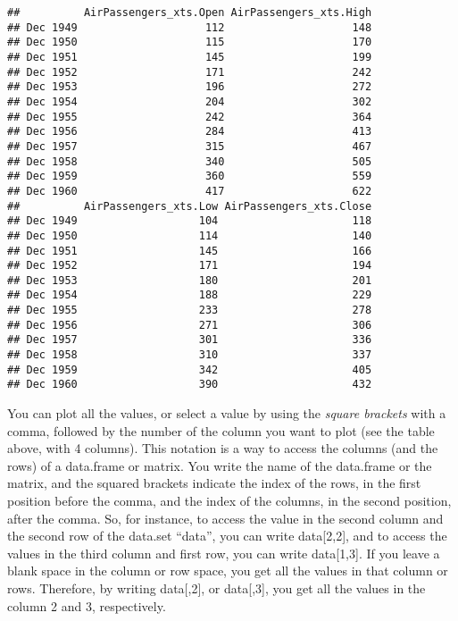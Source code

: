 \documentclass[
]{article}
\begin{document}
\begin{verbatim}
##          AirPassengers_xts.Open AirPassengers_xts.High
## Dec 1949                    112                    148
## Dec 1950                    115                    170
## Dec 1951                    145                    199
## Dec 1952                    171                    242
## Dec 1953                    196                    272
## Dec 1954                    204                    302
## Dec 1955                    242                    364
## Dec 1956                    284                    413
## Dec 1957                    315                    467
## Dec 1958                    340                    505
## Dec 1959                    360                    559
## Dec 1960                    417                    622
##          AirPassengers_xts.Low AirPassengers_xts.Close
## Dec 1949                   104                     118
## Dec 1950                   114                     140
## Dec 1951                   145                     166
## Dec 1952                   171                     194
## Dec 1953                   180                     201
## Dec 1954                   188                     229
## Dec 1955                   233                     278
## Dec 1956                   271                     306
## Dec 1957                   301                     336
## Dec 1958                   310                     337
## Dec 1959                   342                     405
## Dec 1960                   390                     432
\end{verbatim}

You can plot all the values, or select a value by using the \emph{square brackets} with a comma, followed by the number of the column you want to plot (see the table above, with 4 columns). This notation is a way to access the columns (and the rows) of a data.frame or matrix. You write the name of the data.frame or the matrix, and the squared brackets indicate the index of the rows, in the first position before the comma, and the index of the columns, in the second position, after the comma. So, for instance, to access the value in the second column and the second row of the data.set ``data'', you can write data{[}2,2{]}, and to access the values in the third column and first row, you can write data{[}1,3{]}. If you leave a blank space in the column or row space, you get all the values in that column or rows. Therefore, by writing data{[},2{]}, or data{[},3{]}, you get all the values in the column 2 and 3, respectively.
\end{document}

